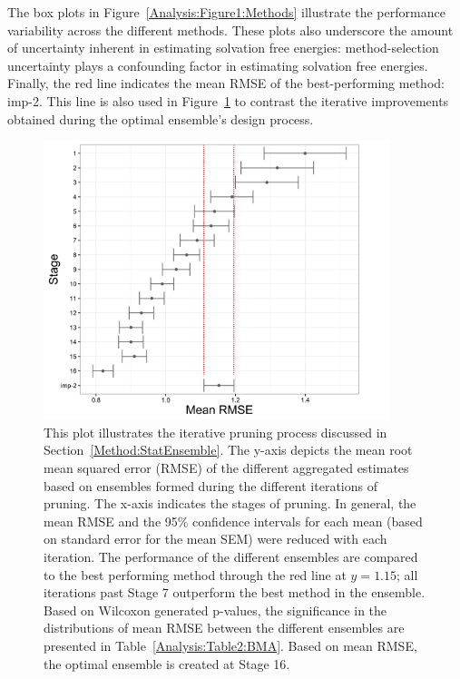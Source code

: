 \documentclass[journal=jpcbfk, manuscript=article]{achemso}
\newcommand{\+}[1]{\ensuremath{\mathbf{#1}}}
\newcommand{\rev}[1]{#1}
\begin{document}
The box plots in Figure~\ref{Analysis:Figure1:Methods} illustrate the performance variability across the different methods.
These plots also underscore the amount of uncertainty inherent in estimating solvation free energies: method-selection uncertainty plays a confounding factor in estimating solvation free energies.
Finally, the red line indicates the mean RMSE of the best-performing method: imp-2.
This line is also used in Figure~\ref{Analysis:Figure2:BMA} to contrast the iterative improvements obtained during the optimal ensemble's design process.
\begin{figure}[h!]
	\centering
	\includegraphics[keepaspectratio,width=0.9\textwidth]{Figures/Rev2/Exploratory_RMSE}
	\caption{This plot illustrates the iterative pruning process discussed in Section~\ref{Method:StatEnsemble}. The y-axis depicts the mean root mean squared error (RMSE) of the different aggregated estimates based on ensembles formed during the different iterations of pruning. The x-axis indicates the stages of pruning. In general, \rev{the mean RMSE and the 95\% confidence intervals for each mean (based on standard error for the mean SEM) were reduced} with each iteration. The performance of the different ensembles are compared to the best performing method through the red line at $y=1.15$; all iterations past Stage 7 outperform the best method in the ensemble. Based on Wilcoxon generated p-values, the significance in the distributions of mean RMSE between the different ensembles are presented in Table~\ref{Analysis:Table2:BMA}. Based on mean RMSE, the optimal ensemble is created at Stage 16.}
	\label{Analysis:Figure2:BMA}
\end{figure}
\end{document}
